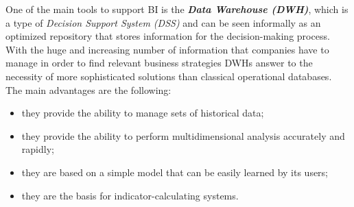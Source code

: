 One of the main tools to support BI is the \textbf{\textit{Data Warehouse (DWH)}}, which is a type of \textit{Decision Support System (DSS)} and can be seen informally as an optimized repository that stores information for the decision-making process. With the huge and increasing number of information that companies have to manage in order to find relevant business strategies DWHs answer to the necessity of more sophisticated solutions than classical operational databases.\\
The main advantages are the following:
\begin{itemize}
    \item they provide the ability to manage sets of historical data;
    \item they provide the ability to perform multidimensional analysis accurately and rapidly;
    \item they are based on a simple model that can be easily learned by its users;
    \item they are the basis for indicator-calculating systems.
\end{itemize}